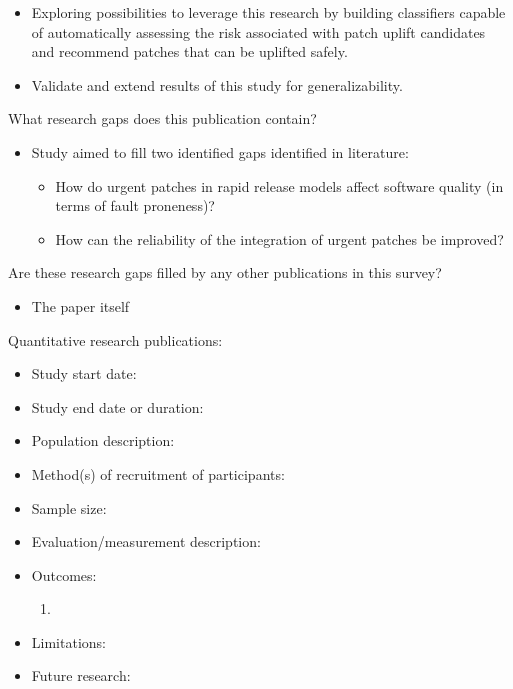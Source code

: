 \documentclass[]{book}
\providecommand{\tightlist}{%
  \setlength{\itemsep}{0pt}\setlength{\parskip}{0pt}}
\begin{document}
\begin{itemize}
\tightlist
\item
  Exploring possibilities to leverage this research by building
  classifiers capable of automatically assessing the risk associated
  with patch uplift candidates and recommend patches that can be
  uplifted safely.
\item
  Validate and extend results of this study for generalizability.
\end{itemize}

What research gaps does this publication contain?

\begin{itemize}
\tightlist
\item
  Study aimed to fill two identified gaps identified in literature:

  \begin{itemize}
  \tightlist
  \item
    How do urgent patches in rapid release models affect software
    quality (in terms of fault proneness)?
  \item
    How can the reliability of the integration of urgent patches be
    improved?
  \end{itemize}
\end{itemize}

Are these research gaps filled by any other publications in this survey?

\begin{itemize}
\tightlist
\item
  The paper itself
\end{itemize}

Quantitative research publications:

\begin{itemize}
\tightlist
\item
  Study start date:
\item
  Study end date or duration:
\item
  Population description:
\item
  Method(s) of recruitment of participants:
\item
  Sample size:
\item
  Evaluation/measurement description:
\item
  Outcomes:

  \begin{enumerate}
  \def\labelenumi{\arabic{enumi}.}
  \item
  \end{enumerate}
\item
  Limitations:
\item
  Future research:
\end{itemize}
\end{document}
